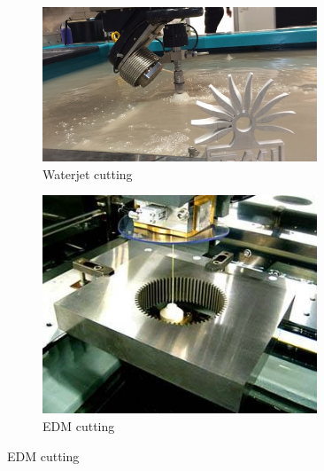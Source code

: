 \begin{figure}[H]
\begin{subfigure}[b]{.24\linewidth}
		\end{subfigure}\begin{subfigure}[b]{.24\linewidth}
			\includegraphics[width=0.9\textwidth]{imgs/waterjet.jpeg}
			\caption{Waterjet cutting}
		\end{subfigure}\begin{subfigure}[b]{.24\linewidth}
			\includegraphics[width=0.9\textwidth]{imgs/edm.jpeg}
			\caption{EDM cutting}
		\end{subfigure}
	\end{figure}
 
